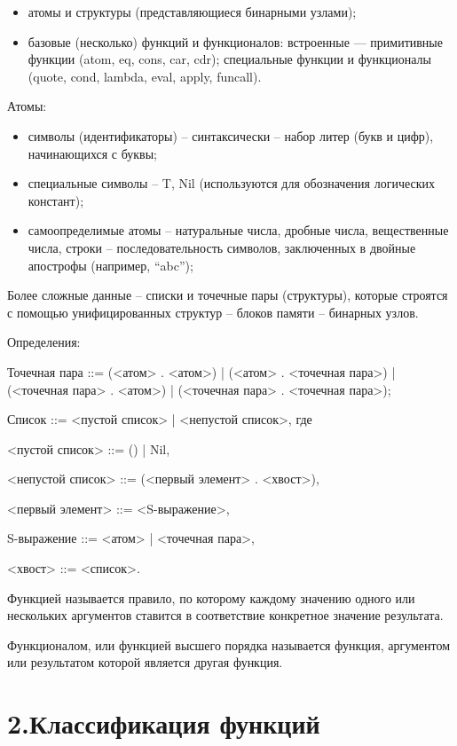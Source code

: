 \documentclass[12pt]{report}
\begin{document}
\begin{itemize}
	\item атомы и структуры (представляющиеся бинарными узлами);
	\item базовые (несколько) функций и функционалов: встроенные — примитивные 
	функции (atom, eq, cons, car, cdr); специальные функции и функционалы (quote, cond, lambda, eval, apply, funcall).
	
\end{itemize}

Атомы:
\begin{itemize} 
	\item символы (идентификаторы) – синтаксически – набор литер (букв и цифр), начинающихся с буквы;
	\item специальные символы – {T, Nil} (используются для обозначения логических констант);
	\item самоопределимые атомы – натуральные числа, дробные числа, вещественные числа, строки – последовательность символов, заключенных в двойные апострофы (например, “abc”);
\end{itemize} 

Более сложные данные – списки и точечные пары (структуры), которые строятся с помощью унифицированных структур – блоков памяти – бинарных узлов.

Определения:

Точечная пара ::= (<атом> . <атом>) | (<атом> . <точечная пара>) | (<точечная пара> . <атом>) | (<точечная пара> . <точечная пара>);

Список ::= <пустой список> | <непустой список>, где 

<пустой список> ::= () | Nil,

<непустой список> ::= (<первый элемент> . <хвост>),

<первый элемент> ::= <S-выражение>,

S-выражение ::= <атом> | <точечная пара>,

<хвост> ::= <список>.


Функцией называется правило, по которому каждому значению одного или нескольких  аргументов ставится в соответствие конкретное значение результата.

Функционалом, или функцией высшего порядка называется функция, аргументом или  результатом которой является другая функция.



	
\section*{2.Классификация функций}
\end{document}
